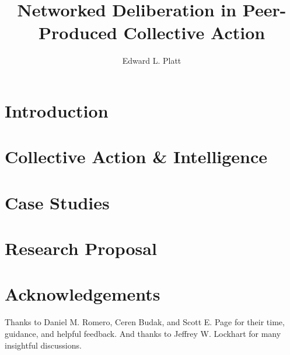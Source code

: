 \documentclass{book}
\author{Edward L. Platt}
\title{Networked Deliberation in Peer-Produced Collective Action}
\begin{document}
\maketitle

\tableofcontents

\chapter{Introduction}


\chapter{Collective Action \& Intelligence}


\chapter{Case Studies}


\chapter{Research Proposal}


\chapter*{Acknowledgements}
Thanks to Daniel M. Romero,
Ceren Budak, and
Scott E. Page for their time, guidance, and helpful feedback.
And thanks to Jeffrey W. Lockhart for many insightful discussions.

\nocite{*}


\end{document}
